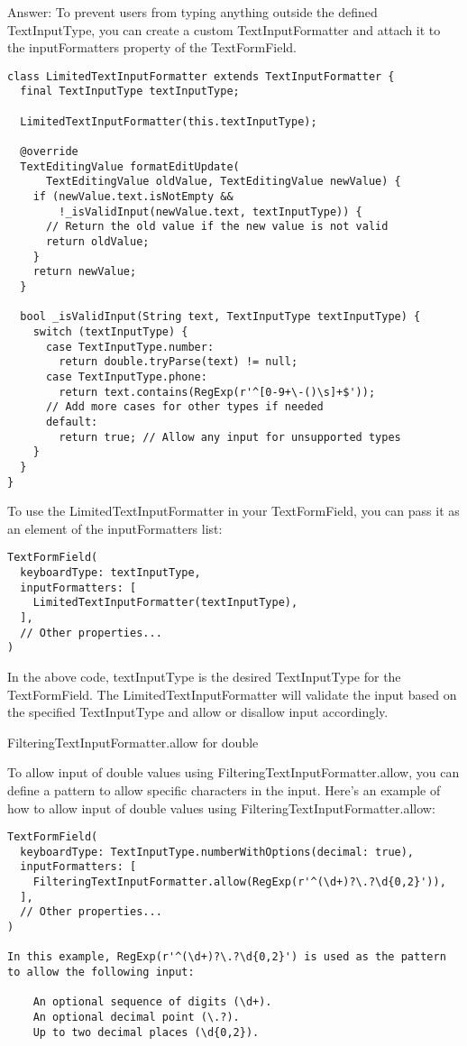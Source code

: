 Answer: To prevent users from typing anything outside the defined TextInputType, you can create a custom 
TextInputFormatter and attach it to the inputFormatters property of the TextFormField.

\begin{lstlisting}
class LimitedTextInputFormatter extends TextInputFormatter {
  final TextInputType textInputType;

  LimitedTextInputFormatter(this.textInputType);

  @override
  TextEditingValue formatEditUpdate(
      TextEditingValue oldValue, TextEditingValue newValue) {
    if (newValue.text.isNotEmpty &&
        !_isValidInput(newValue.text, textInputType)) {
      // Return the old value if the new value is not valid
      return oldValue;
    }
    return newValue;
  }

  bool _isValidInput(String text, TextInputType textInputType) {
    switch (textInputType) {
      case TextInputType.number:
        return double.tryParse(text) != null;
      case TextInputType.phone:
        return text.contains(RegExp(r'^[0-9+\-()\s]+$'));
      // Add more cases for other types if needed
      default:
        return true; // Allow any input for unsupported types
    }
  }
}
\end{lstlisting}

To use the LimitedTextInputFormatter in your TextFormField, you can pass it as an element of the inputFormatters list:

\begin{lstlisting}
TextFormField(
  keyboardType: textInputType,
  inputFormatters: [
    LimitedTextInputFormatter(textInputType),
  ],
  // Other properties...
)
\end{lstlisting}

In the above code, textInputType is the desired TextInputType for the TextFormField. The LimitedTextInputFormatter 
will validate the input based on the specified TextInputType and allow or disallow input accordingly.

FilteringTextInputFormatter.allow for double

To allow input of double values using FilteringTextInputFormatter.allow, you can define a pattern to allow specific 
characters in the input. Here's an example of how to allow input of double values using 
FilteringTextInputFormatter.allow:

\begin{lstlisting}
TextFormField(
  keyboardType: TextInputType.numberWithOptions(decimal: true),
  inputFormatters: [
    FilteringTextInputFormatter.allow(RegExp(r'^(\d+)?\.?\d{0,2}')),
  ],
  // Other properties...
)

In this example, RegExp(r'^(\d+)?\.?\d{0,2}') is used as the pattern to allow the following input:

    An optional sequence of digits (\d+).
    An optional decimal point (\.?).
    Up to two decimal places (\d{0,2}).
\end{lstlisting}

